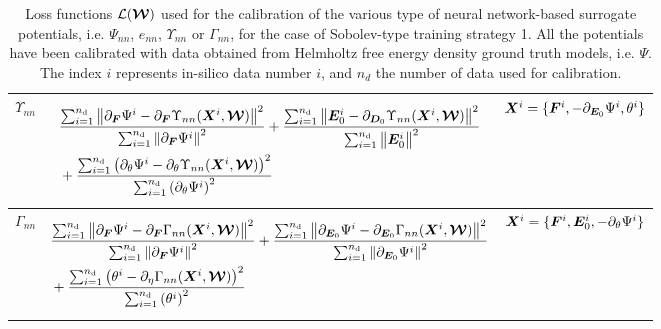 \begin{table}[htbp!]
\begin{tabular}{c c c}
		\midrule
 $\Upsilon_{nn}$ &		\begin{minipage}{0.68\textwidth}
			\begin{equation*}
			\begin{aligned}
			& \frac{\sum_{i=1}^{n_{\text{d}}} \left\| \partial_{\boldsymbol{F}}\Psi^{i} - \partial_{\boldsymbol{F}} \Upsilon_{nn}(\boldsymbol{X}^i, \boldsymbol{\mathcal{W}}) \right\|^2}{\sum_{i=1}^{n_{\text{d}}} \left\| \partial_{\boldsymbol{F}}\Psi^{i} \right\|^2}  + \frac{\sum_{i=1}^{n_{\text{d}}} \left\| \boldsymbol{E}_0^{i} - \partial_{\boldsymbol{D}_0} \Upsilon_{nn}(\boldsymbol{X}^i, \boldsymbol{\mathcal{W}}) \right\|^2}{\sum_{i=1}^{n_{\text{d}}} \left\| \boldsymbol{E}_0^{i} \right\|^2} \\
			& + \frac{\sum_{i=1}^{n_{\text{d}}} \left( \partial_{\theta}\Psi^{i} - \partial_{\theta} \Upsilon_{nn}(\boldsymbol{X}^i, \boldsymbol{\mathcal{W}}) \right)^2}{\sum_{i=1}^{n_{\text{d}}} \left( \partial_{\theta}\Psi^{i} \right)^2}
			\end{aligned}
			\end{equation*}
		\end{minipage}  & $\boldsymbol{X}^i=\{\boldsymbol{F}^i, -\partial_{\boldsymbol{E}_0}\Psi^i, \theta^i\}$ 	\\
		\midrule
 $\Gamma_{nn}$	&	\begin{minipage}{0.68\textwidth}
			\begin{equation*}
			\begin{aligned}
			& \frac{\sum_{i=1}^{n_{\text{d}}} \left\| \partial_{\boldsymbol{F}}\Psi^{i} - \partial_{\boldsymbol{F}} \Gamma_{nn}(\boldsymbol{X}^i, \boldsymbol{\mathcal{W}}) \right\|^2}{\sum_{i=1}^{n_{\text{d}}} \left\|\partial_{\boldsymbol{F}}\Psi^{i} \right\|^2}  + \frac{\sum_{i=1}^{n_{\text{d}}} \left\| \partial_{\boldsymbol{E}_0}\Psi^{i} - \partial_{\boldsymbol{E}_0} \Gamma_{nn}(\boldsymbol{X}^i, \boldsymbol{\mathcal{W}}) \right\|^2}{\sum_{i=1}^{n_{\text{d}}} \left\| \partial_{\boldsymbol{E}_0}\Psi^{i} \right\|^2} \\
			& + \frac{\sum_{i=1}^{n_{\text{d}}} \left( \theta^{i} - \partial_{\eta} \Gamma_{nn}(\boldsymbol{X}^i, \boldsymbol{\mathcal{W}}) \right)^2}{\sum_{i=1}^{n_{\text{d}}} \left( \theta^{i} \right)^2}
			\end{aligned}
			\end{equation*}
		\end{minipage} & $\boldsymbol{X}^i=\{\boldsymbol{F}^i, \boldsymbol{E}_0^i, -\partial_{\theta}\Psi^i\}$	\\
		\midrule
		
		
	\end{tabular}
	\caption{Loss functions $\mathcal{L}(\boldsymbol{\mathcal{W}})$ used for the calibration of the various type of neural network-based surrogate potentials, i.e. $\Psi_{nn}$, $e_{nn}$, $\Upsilon_{nn}$ or $\Gamma_{nn}$, for the case of Sobolev-type training strategy 1. All the potentials have been calibrated with data obtained from Helmholtz free energy density ground truth models, i.e. $\Psi$. The index $i$ represents in-silico data number $i$, and $n_d$ the number of data used for calibration.}
	\label{table: sobolev type 1}
\end{table}






